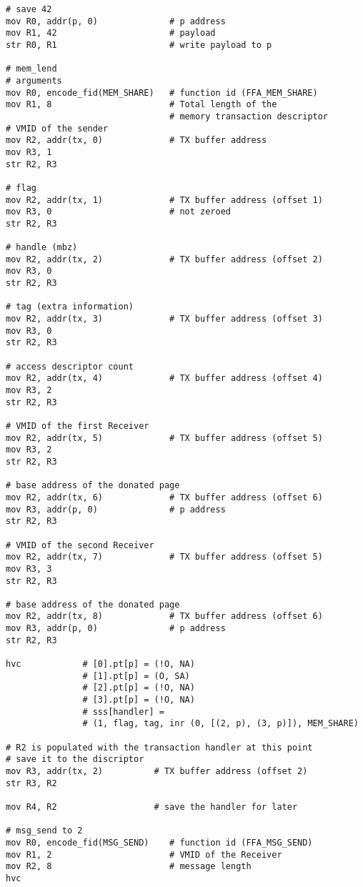 \documentclass{article}
\begin{document}
\begin{lstlisting}[caption={VM 1}]
# save 42
mov R0, addr(p, 0)              # p address
mov R1, 42                      # payload
str R0, R1                      # write payload to p

# mem_lend
# arguments
mov R0, encode_fid(MEM_SHARE)   # function id (FFA_MEM_SHARE)
mov R1, 8                       # Total length of the  
                                # memory transaction descriptor
# VMID of the sender 
mov R2, addr(tx, 0)             # TX buffer address                               
mov R3, 1
str R2, R3

# flag
mov R2, addr(tx, 1)             # TX buffer address (offset 1)                               
mov R3, 0                       # not zeroed
str R2, R3

# handle (mbz)
mov R2, addr(tx, 2)             # TX buffer address (offset 2)
mov R3, 0
str R2, R3

# tag (extra information)
mov R2, addr(tx, 3)             # TX buffer address (offset 3)
mov R3, 0
str R2, R3

# access descriptor count
mov R2, addr(tx, 4)             # TX buffer address (offset 4)
mov R3, 2
str R2, R3

# VMID of the first Receiver
mov R2, addr(tx, 5)             # TX buffer address (offset 5)
mov R3, 2
str R2, R3

# base address of the donated page
mov R2, addr(tx, 6)             # TX buffer address (offset 6)
mov R3, addr(p, 0)              # p address
str R2, R3

# VMID of the second Receiver
mov R2, addr(tx, 7)             # TX buffer address (offset 5)
mov R3, 3
str R2, R3

# base address of the donated page
mov R2, addr(tx, 8)             # TX buffer address (offset 6)
mov R3, addr(p, 0)              # p address
str R2, R3

hvc            # [0].pt[p] = (!O, NA)
               # [1].pt[p] = (O, SA)
               # [2].pt[p] = (!O, NA)
               # [3].pt[p] = (!O, NA)
               # sss[handler] = 
               # (1, flag, tag, inr (0, [(2, p), (3, p)]), MEM_SHARE)

# R2 is populated with the transaction handler at this point
# save it to the discriptor
mov R3, addr(tx, 2)          # TX buffer address (offset 2)
str R3, R2

mov R4, R2                   # save the handler for later

# msg_send to 2
mov R0, encode_fid(MSG_SEND)    # function id (FFA_MSG_SEND)
mov R1, 2                       # VMID of the Receiver
mov R2, 8                       # message length
hvc


\end{lstlisting}
\end{document}
